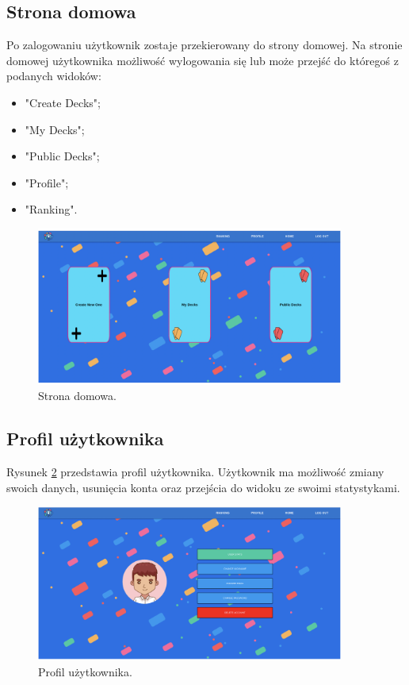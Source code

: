 \subsection{Strona domowa}
Po zalogowaniu użytkownik zostaje przekierowany do strony domowej. Na stronie domowej użytkownika możliwość wylogowania się lub może przejść do któregoś z podanych widoków:
\begin{itemize}
    \item "Create Decks";
    \item "My Decks";
    \item "Public Decks";
    \item "Profile";
    \item "Ranking".
\end{itemize}


\begin{figure}[H]
    \centering
    \includegraphics[width=0.9\textwidth]{chapters/chapter_10/images_web/web_home}
    \caption{Strona domowa.}
    \label{img:web_home}
\end{figure}


\subsection{Profil użytkownika}
Rysunek \ref{img:web_profile} przedstawia profil użytkownika. Użytkownik ma możliwość zmiany swoich danych, usunięcia konta oraz przejścia do widoku ze swoimi statystykami.


\begin{figure}[H]
    \centering
    \includegraphics[width=0.9\textwidth]{chapters/chapter_10/images_web/web_profile}
    \caption{Profil użytkownika.}
    \label{img:web_profile}
\end{figure}

